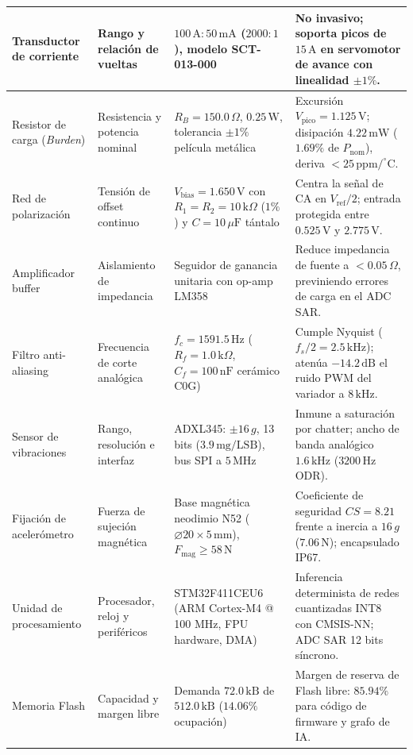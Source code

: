 {\begin{longtable}{L{2.5cm}L{2.9cm}L{3.3cm}L{4.5cm}}
Transductor de corriente & Rango y relación de vueltas & $100\,\text{A} : 50\,\text{mA}$ ($2000:1$), modelo SCT-013-000 & No invasivo; soporta picos de $15\,\text{A}$ en servomotor de avance con linealidad $\pm 1\%$. \\ \hline
Resistor de carga (\textit{Burden}) & Resistencia y potencia nominal & $R_B = 150.0\,\Omega$, $0.25\,\text{W}$, tolerancia $\pm 1\%$ película metálica & Excursión $V_{\text{pico}} = 1.125\,\text{V}$; disipación $4.22\,\text{mW}$ ($1.69\%$ de $P_{\text{nom}}$), deriva $< 25\,\text{ppm/}^\circ\text{C}$. \\ \hline
Red de polarización & Tensión de offset continuo & $V_{\text{bias}} = 1.650\,\text{V}$ con $R_1=R_2=10\,\text{k}\Omega$ ($1\%$) y $C=10\,\mu\text{F}$ tántalo & Centra la señal de CA en $V_{\text{ref}}/2$; entrada protegida entre $0.525\,\text{V}$ y $2.775\,\text{V}$. \\ \hline
Amplificador buffer & Aislamiento de impedancia & Seguidor de ganancia unitaria con op-amp LM358 & Reduce impedancia de fuente a $<0.05\,\Omega$, previniendo errores de carga en el ADC SAR. \\ \hline
Filtro anti-aliasing & Frecuencia de corte analógica & $f_c = 1591.5\,\text{Hz}$ ($R_f=1.0\,\text{k}\Omega$, $C_f=100\,\text{nF}$ cerámico C0G) & Cumple Nyquist ($f_s/2 = 2.5\,\text{kHz}$); atenúa $-14.2\,\text{dB}$ el ruido PWM del variador a $8\,\text{kHz}$. \\ \hline
Sensor de vibraciones & Rango, resolución e interfaz & ADXL345: $\pm 16\,g$, 13 bits ($3.9\,\text{mg/LSB}$), bus SPI a $5\,\text{MHz}$ & Inmune a saturación por chatter; ancho de banda analógico $1.6\,\text{kHz}$ ($3200\,\text{Hz}$ ODR). \\ \hline
Fijación de acelerómetro & Fuerza de sujeción magnética & Base magnética neodimio N52 ($\varnothing 20 \times 5\,\text{mm}$), $F_{\text{mag}} \ge 58\,\text{N}$ & Coeficiente de seguridad $CS = 8.21$ frente a inercia a $16\,g$ ($7.06\,\text{N}$); encapsulado IP67. \\ \hline
Unidad de procesamiento & Procesador, reloj y periféricos & STM32F411CEU6 (ARM Cortex-M4 @ 100 MHz, FPU hardware, DMA) & Inferencia determinista de redes cuantizadas INT8 con CMSIS-NN; ADC SAR 12 bits síncrono. \\ \hline
Memoria Flash & Capacidad y margen libre & Demanda $72.0\,\text{kB}$ de $512.0\,\text{kB}$ ($14.06\%$ ocupación) & Margen de reserva de Flash libre: $85.94\%$ para código de firmware y grafo de IA. \\ \hline

\end{longtable}}
